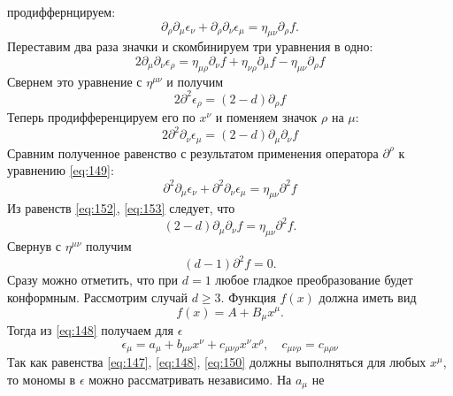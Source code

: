 \documentclass[a4paper,12pt]{article} \usepackage[utf8x]{inputenc} \usepackage[russian]{babel}
\theoremstyle{definition} \newtheorem{corollary}{Corollary}[theorem] \theoremstyle{definition}
\begin{document}
продиффернцируем:
\begin{equation}
  \label{eq:149}
  \partial_{\rho} \partial_{\mu}\epsilon_{\nu}+\partial_{\rho}\partial_{\nu}\epsilon_{\mu}=\eta_{\mu\nu}\partial_{\rho}
f.
\end{equation} Переставим два раза значки и скомбинируем три уравнения в одно:
\begin{equation}
  \label{eq:150} 2\partial_{\mu}\partial_{\nu}\epsilon_{\rho}=\eta_{\mu\rho}\partial_{\nu}
f+\eta_{\nu\rho}\partial_{\mu}f-\eta_{\mu\nu}\partial_{\rho}f
\end{equation} Свернем это уравнение с $\eta^{\mu\nu}$ и получим
\begin{equation}
  \label{eq:151} 2\partial^2 \epsilon_{\rho}=(2-d)\partial_{\rho}f
\end{equation} Теперь продифференцируем его по $x^{\nu}$ и поменяем значок $\rho$ на $\mu$:
\begin{equation}
  \label{eq:152} 2\partial^2 \partial_{\nu} \epsilon_{\mu}=(2-d)\partial_{\mu}\partial_{\nu} f
\end{equation} Сравним полученное равенство с результатом применения оператора $\partial^{\rho}$ к
уравнению \eqref{eq:149}:
\begin{equation}
  \label{eq:153}
  \partial^2 \partial_{\mu}\epsilon_{\nu}+\partial^2 \partial_{\nu}\epsilon_{\mu}=\eta_{\mu\nu}\partial^2
f
\end{equation} Из равенств \eqref{eq:152}, \eqref{eq:153} следует, что
\begin{equation}
  \label{eq:154} (2-d)\partial_{\mu}\partial_{\nu}f=\eta_{\mu\nu}\partial^2 f.
\end{equation} Свернув с $\eta^{\mu\nu}$ получим
\begin{equation}
  \label{eq:155} (d-1)\partial^2 f =0.
\end{equation} Сразу можно отметить, что при $d=1$ любое гладкое преобразование будет конформным.
Рассмотрим случай $d\geq 3$. Функция $f(x)$ должна иметь вид
\begin{equation}
  \label{eq:156} f(x)=A+B_{\mu}x^{\mu}.
\end{equation} Тогда из \eqref{eq:148} получаем для $\epsilon$
\begin{equation}
  \label{eq:157} \epsilon_{\mu}=a_{\mu}+b_{\mu\nu}x^{\nu} +c_{\mu\nu\rho}x^{\nu}x^{\rho},\quad
c_{\mu\nu\rho}=c_{\mu\rho\nu}
\end{equation} Так как равенства \eqref{eq:147}, \eqref{eq:148}, \eqref{eq:150} должны выполняться
для любых $x^{\mu}$, то мономы в $\epsilon$ можно рассматривать независимо. На $a_{\mu}$ не
\end{document}
